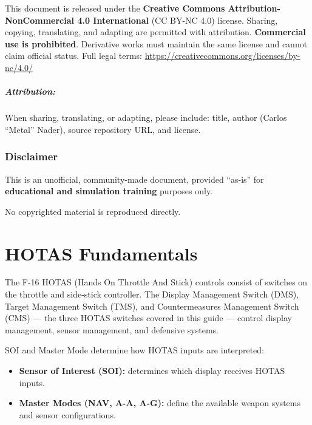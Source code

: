 \documentclass[11pt, a4paper, twoside]{report}
\begin{document}
This document is released under the \textbf{Creative Commons Attribution-NonCommercial 4.0 International} (CC BY-NC 4.0) license. Sharing, copying, translating, and adapting are permitted with attribution. \textbf{Commercial use is prohibited}. Derivative works must maintain the same license and cannot claim official status. Full legal terms: \url{https://creativecommons.org/licenses/by-nc/4.0/}

\paragraph{Attribution:}
When sharing, translating, or adapting, please include: title, author (Carlos ``Metal'' Nader), source repository URL, and license.

\subsection{Disclaimer}
\label{sec:C1-S4-S4}

This is an unofficial, community-made document, provided ``as-is'' for \textbf{educational and simulation training} purposes only.

No copyrighted material is reproduced directly.

\chapter{HOTAS Fundamentals}
\label{chap:C2}
The F-16 HOTAS (Hands On Throttle And Stick) controls consist of switches on the throttle and side-stick controller. The Display Management Switch (DMS), Target Management Switch (TMS), and Countermeasures Management Switch (CMS) --- the three HOTAS switches covered in this guide --- control display management, sensor management, and defensive systems.

SOI and Master Mode determine how HOTAS inputs are interpreted:

\begin{itemize}
    \item \textbf{Sensor of Interest (SOI):} determines which display receives HOTAS inputs.
    \item \textbf{Master Modes (NAV, A-A, A-G):} define the available weapon systems and sensor configurations.
\end{itemize}
\end{document}
